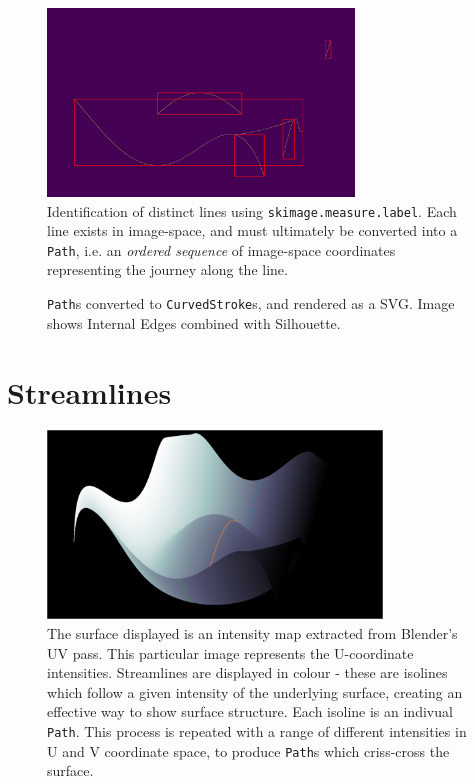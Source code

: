 \begin{figure}[h!]
	\centering
	\includegraphics[height=5cm]{images/int_labels.png}
	\caption{Identification of distinct lines using \texttt{skimage.measure.label}. Each line exists in image-space, and must ultimately be converted into a \texttt{Path}, i.e. an \emph{ordered sequence} of image-space coordinates representing the journey along the line.}\label{int_labels}
\end{figure}

\begin{figure}[h!]
	\centering
	
	\caption{\texttt{Path}s converted to \texttt{CurvedStroke}s, and rendered as a SVG. Image shows Internal Edges combined with Silhouette.}\label{int}
\end{figure}

\FloatBarrier
\section{Streamlines}
\begin{figure}[h!]
	\centering
	\includegraphics[height=5cm]{images/stream_cont1.png}
	\caption{The surface displayed is an intensity map extracted from Blender's UV pass. This particular image represents the U-coordinate intensities. Streamlines are displayed in colour - these are isolines which follow a given intensity of the underlying surface, creating an effective way to show surface structure. Each isoline is an indivual \texttt{Path}. This process is repeated with a range of different intensities in U and V coordinate space, to produce \texttt{Path}s which criss-cross the surface.}\label{stream_cont1}
\end{figure}

